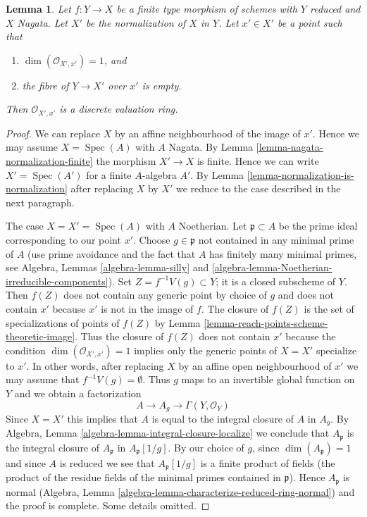 \documentclass[10pt,a4paper]{amsart}
\theoremstyle{plain}
\newtheorem{lemma}[subsection]{Lemma}
\theoremstyle{definition}
\theoremstyle{remark}
\numberwithin{equation}{subsection}
\def\Spec{\mathop{\mathrm{Spec}}}
\begin{document}
\begin{lemma}
\label{lemma-relative-normalization-normal-codim-1}
Let $f : Y \to X$ be a finite type morphism of schemes with $Y$ reduced
and $X$ Nagata. Let $X'$ be the normalization of $X$ in $Y$.
Let $x' \in X'$ be a point such that
\begin{enumerate}
\item $\dim(\mathcal{O}_{X', x'}) = 1$, and
\item the fibre of $Y \to X'$ over $x'$ is empty.
\end{enumerate}
Then $\mathcal{O}_{X', x'}$ is a discrete valuation ring.
\end{lemma}

\begin{proof}
We can replace $X$ by an affine neighbourhood of the image of $x'$.
Hence we may assume $X = \Spec(A)$ with $A$ Nagata.
By Lemma \ref{lemma-nagata-normalization-finite}
the morphism $X' \to X$ is finite. Hence we can write
$X' = \Spec(A')$ for a finite $A$-algebra $A'$.
By Lemma \ref{lemma-normalization-is-normalization}
after replacing $X$ by $X'$
we reduce to the case described in the next paragraph.

\medskip\noindent
The case $X = X' = \Spec(A)$ with $A$ Noetherian.
Let $\mathfrak p \subset A$ be the prime ideal
corresponding to our point $x'$. Choose $g \in \mathfrak p$
not contained in any minimal prime of $A$ (use prime avoidance
and the fact that $A$ has finitely many minimal primes, see
Algebra, Lemmas \ref{algebra-lemma-silly} and
\ref{algebra-lemma-Noetherian-irreducible-components}).
Set $Z = f^{-1}V(g) \subset Y$; it is a closed subscheme of $Y$.
Then $f(Z)$ does not contain any generic point by choice of $g$
and does not contain $x'$ because $x'$ is not in the image of $f$.
The closure of $f(Z)$ is the set of specializations of points
of $f(Z)$ by Lemma \ref{lemma-reach-points-scheme-theoretic-image}.
Thus the closure of $f(Z)$ does not contain $x'$ because
the condition $\dim(\mathcal{O}_{X', x'}) = 1$ implies only
the generic points of $X = X'$ specialize to $x'$.
In other words, after replacing $X$ by an affine open
neighbourhood of $x'$ we may assume that $f^{-1}V(g) = \emptyset$.
Thus $g$ maps to an invertible global function on $Y$ and
we obtain a factorization
$$
A \to A_g \to \Gamma(Y, \mathcal{O}_Y)
$$
Since $X = X'$ this implies that $A$ is equal to the integral
closure of $A$ in $A_g$. By
Algebra, Lemma \ref{algebra-lemma-integral-closure-localize}
we conclude that $A_\mathfrak p$ is the integral closure
of $A_\mathfrak p$ in $A_\mathfrak p[1/g]$.
By our choice of $g$, since $\dim(A_\mathfrak p) = 1$
and since $A$ is reduced we see that $A_\mathfrak p[1/g]$
is a finite product of fields (the product of the residue fields
of the minimal primes contained in $\mathfrak p$). Hence $A_\mathfrak p$ is
normal (Algebra, Lemma \ref{algebra-lemma-characterize-reduced-ring-normal})
and the proof is complete. Some details omitted.
\end{proof}
\end{document}
